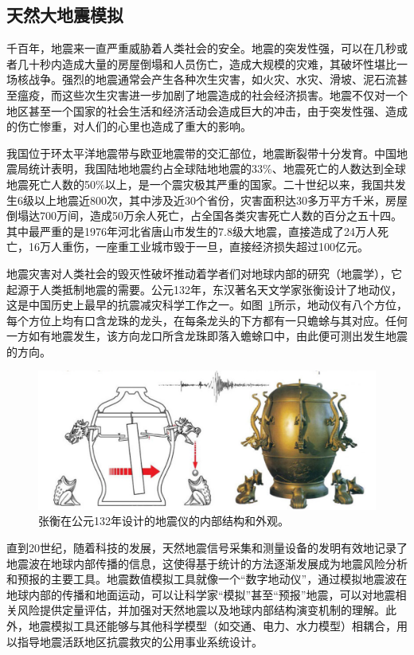 \documentclass[degree=doctor]{thuthesis}
\begin{document}
\subsection{天然大地震模拟}

千百年，地震来一直严重威胁着人类社会的安全。地震的突发性强，可以在几秒或者几十秒内造成大量的房屋倒塌和人员伤亡，造成大规模的灾难，其破坏性堪比一场核战争。强烈的地震通常会产生各种次生灾害，如火灾、水灾、滑坡、泥石流甚至瘟疫，而这些次生灾害进一步加剧了地震造成的社会经济损害。地震不仅对一个地区甚至一个国家的社会生活和经济活动会造成巨大的冲击，由于突发性强、造成的伤亡惨重，对人们的心里也造成了重大的影响。

我国位于环太平洋地震带与欧亚地震带的交汇部位，地震断裂带十分发育。中国地震局统计表明，我国陆地地震约占全球陆地地震的33\%、地震死亡的人数达到全球地震死亡人数的50\%以上，是一个震灾极其严重的国家\cite{地震局}。二十世纪以来，我国共发生6级以上地震近800次，其中涉及近30个省份，灾害面积达30多万平方千米，房屋倒塌达700万间，造成50万余人死亡，占全国各类灾害死亡人数的百分之五十四。其中最严重的是1976年河北省唐山市发生的7.8级大地震，直接造成了24万人死亡，16万人重伤，一座重工业城市毁于一旦，直接经济损失超过100亿元\cite{地震局}。

地震灾害对人类社会的毁灭性破坏推动着学者们对地球内部的研究（地震学），它起源于人类抵制地震的需要。公元132年，东汉著名天文学家张衡设计了地动仪，这是中国历史上最早的抗震减灾科学工作之一\citep{stein2009introduction}。如图~\ref{fig:heng-scope}所示，地动仪有八个方位，每个方位上均有口含龙珠的龙头，在每条龙头的下方都有一只蟾蜍与其对应。任何一方如有地震发生，该方向龙口所含龙珠即落入蟾蜍口中，由此便可测出发生地震的方向\cite{seismoscopewiki}。

\begin{figure}[ht]
\centering
\includegraphics[width=0.7\columnwidth]{seismoscope.png}
\caption{张衡在公元132年设计的地震仪的内部结构和外观\citep{hsiao2009review}。}
\label{fig:heng-scope}
\end{figure}

直到20世纪，随着科技的发展，天然地震信号采集和测量设备的发明有效地记录了地震波在地球内部传播的信息，这使得基于统计的方法逐渐发展成为地震风险分析和预报的主要工具。地震数值模拟工具就像一个“数字地动仪”，通过模拟地震波在地球内部的传播和地面运动，可以让科学家“模拟”甚至“预报”地震，可以对地震相关风险提供定量评估，并加强对天然地震以及地球内部结构演变机制的理解。此外，地震模拟工具还能够与其他科学模型（如交通、电力、水力模型）相耦合，用以指导地震活跃地区抗震救灾的公用事业系统设计。
\end{document}
